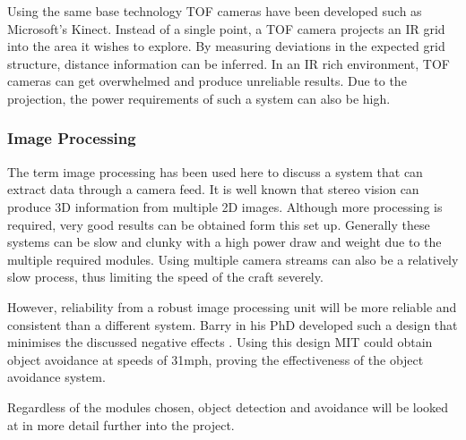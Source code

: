 				Using the same base technology TOF cameras have been developed such as Microsoft's Kinect. Instead of a single point, a TOF camera projects an IR grid into the area it wishes to explore. By measuring deviations in the expected grid structure, distance information can be inferred. In an IR rich environment, TOF cameras can get overwhelmed and produce unreliable results. Due to the projection, the power requirements of such a system can also be high.
		
				\subsubsection{Image Processing}
				The term image processing has been used here to discuss a system that can extract data through a camera feed. It is well known that stereo vision can produce 3D information from multiple 2D images. Although more processing is required, very good results can be obtained form this set up. Generally these systems can be slow and clunky with a high power draw and weight due to the multiple required modules. Using multiple camera streams can also be a relatively slow process, thus limiting the speed of the craft severely.
				
				However, reliability from a robust image processing unit will be more reliable and consistent than a different system. Barry in his PhD developed such a design that minimises the discussed negative effects \cite{Barry2016}. Using this design MIT could obtain object avoidance at speeds of 31mph, proving the effectiveness of the object avoidance system.
				
				Regardless of the modules chosen, object detection and avoidance will be looked at in more detail further into the project.
		
%			
		
